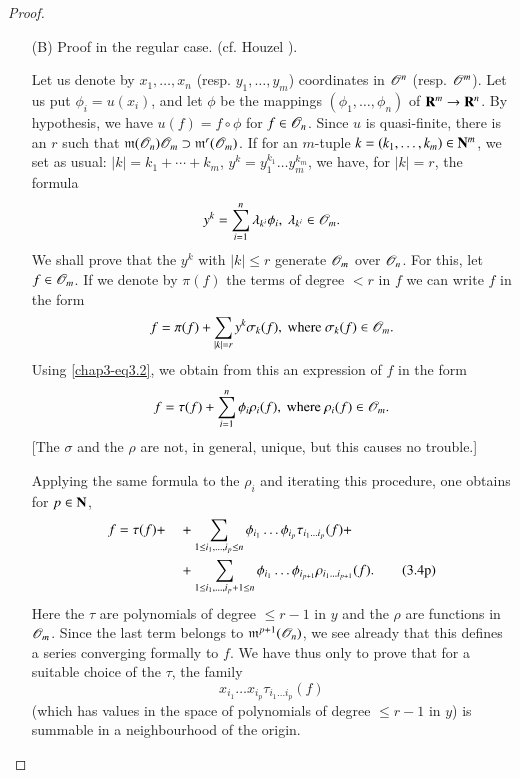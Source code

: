 \begin{proof}
\begin{itemize}
\item[(B)] {\rm Proof in the regular case.} (cf. Houzel \cite{C. Houzel : 1}).

Let us denote by $x_{1},\ldots,x_{n}$ (resp. $y_{1},\ldots,y_{m}$) coordinates in $\mathscr{O}^{n}$ (resp. $\mathscr{O}^{m}$). Let us put $\phi_{i}=u(x_{i})$, and let $\phi$ be the mappings $(\phi_{1},\ldots,\phi_{n})$ of $\mathbf{R}^{m}\to \mathbf{R}^{n}$. By hypothesis, we have $u(f)=f\circ \phi$ for $f\in \mathscr{O}_{n}$. Since $u$ is quasi-finite, there is an $r$ such that $\mathfrak{m}(\mathscr{O}_{n})\mathscr{O}_{m}\supset \mathfrak{m}^{r}(\mathscr{O}_{m})$. If for an $m$-tuple $k=(k_{1},\ldots,k_{m})\in \mathbf{N}^{m}$, we set as usual: $|k|=k_{1}+\cdots+k_{m}$, $y^{k}=y^{k_{1}}_{1}\ldots y^{k_{m}}_{m}$, we have, for $|k|=r$, the formula
\setcounter{equation}{1}
\begin{equation}
y^{k}=\sum\limits^{n}_{i=1}\lambda_{k^{i}}\phi_{i}, \ \lambda_{k^{i}}\in \mathscr{O}_{m}.\label{chap3-eq3.2}
\end{equation}
We shall prove that the $y^{k}$ with $|k|\leq r$ generate $\mathscr{O}_{m}$ over $\mathscr{O}_{n}$. For this, let $f\in \mathscr{O}_{m}$. If we denote by $\pi(f)$ the terms of degree $<r$ in $f$ we can write $f$ in the form
\begin{equation}
f=\pi(f)+\sum\limits_{|k|=r}y^{k}\sigma_{k}(f),\text{ where } \sigma_{k}(f)\in \mathscr{O}_{m}.\label{chap3-eq3.3}
\end{equation}\pageoriginale
Using \eqref{chap3-eq3.2}, we obtain from this an expression of $f$ in the form
\begin{equation}
f=\tau(f)+\sum\limits^{n}_{i=1}\phi_{i}\rho_{i}(f),\text{ where } \rho_{i}(f)\in \mathscr{O}_{m}.\label{chap3-eq3.4}
\end{equation}
[The $\sigma$ and the $\rho$ are not, in general, unique, but this causes no trouble.]

Applying the same formula to the $\rho_{i}$ and iterating this procedure, one obtains for $p\in \mathbf{N}$,
\begin{align*}
f=\tau(f) +\quad & + \sum\limits\limits_{1\leq i_{1},\ldots,i_{p}\leq n}\phi_{i_{1}}\ldots \phi_{i_{p}}\tau_{i_{1}\ldots i_{p}}(f)+\\
&+ \sum\limits_{1\leq i_{1},\ldots,i_{p}+1\leq n}\phi_{i_{1}}\ldots \phi_{i_{p+1}}\rho_{i_{1}\ldots i_{p+1}}(f).\tag{3.4p}\label{chap3-eq3.4p}
\end{align*}
Here the $\tau$ are polynomials of degree $\leq r-1$ in $y$ and the $\rho$ are functions in $\mathscr{O}_{m}$. Since the last term belongs to $\mathfrak{m}^{p+1}(\mathscr{O}_{n})$, we see already that this defines a series converging formally to $f$. We have thus only to prove that for a suitable choice of the $\tau$, the family
\begin{equation}
x_{i_{1}}\ldots x_{i_{p}}\tau_{i_{1}\ldots i_{p}}(f)\label{chap3-eq3.5}
\end{equation}
(which has values in the space of polynomials of degree $\leq r-1$ in $y$) is summable in a neighbourhood of the origin.
\end{itemize}


\end{proof}
